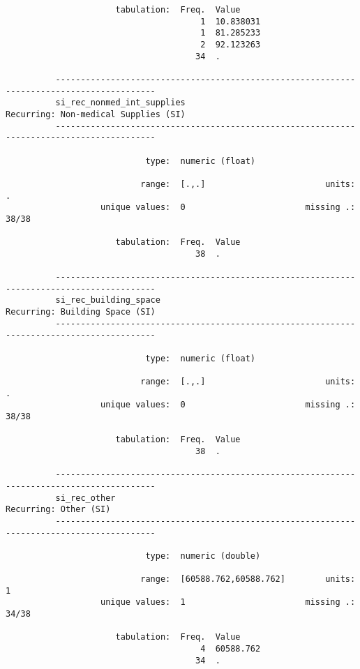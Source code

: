 \documentclass{article}
\begin{document}
\begin{verbatim}
                      tabulation:  Freq.  Value
                                       1  10.838031
                                       1  81.285233
                                       2  92.123263
                                      34  .
          
          ------------------------------------------------------------------------------------------
          si_rec_nonmed_int_supplies                            Recurring: Non-medical Supplies (SI)
          ------------------------------------------------------------------------------------------
          
                            type:  numeric (float)
          
                           range:  [.,.]                        units:  .
                   unique values:  0                        missing .:  38/38
          
                      tabulation:  Freq.  Value
                                      38  .
          
          ------------------------------------------------------------------------------------------
          si_rec_building_space                                       Recurring: Building Space (SI)
          ------------------------------------------------------------------------------------------
          
                            type:  numeric (float)
          
                           range:  [.,.]                        units:  .
                   unique values:  0                        missing .:  38/38
          
                      tabulation:  Freq.  Value
                                      38  .
          
          ------------------------------------------------------------------------------------------
          si_rec_other                                                         Recurring: Other (SI)
          ------------------------------------------------------------------------------------------
          
                            type:  numeric (double)
          
                           range:  [60588.762,60588.762]        units:  1
                   unique values:  1                        missing .:  34/38
          
                      tabulation:  Freq.  Value
                                       4  60588.762
                                      34  .
          

\end{verbatim}
\end{document}
